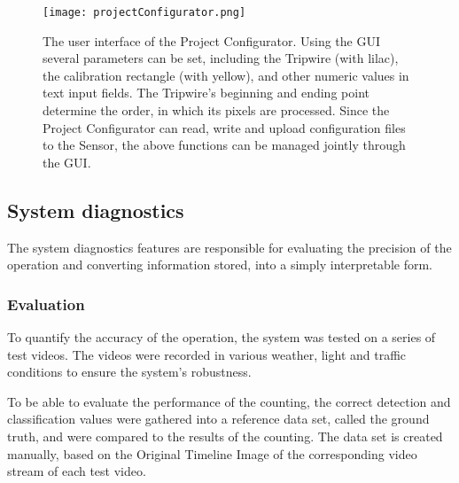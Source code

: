 \begin{figure}[!h]
	\centering
	\texttt{[image: projectConfigurator.png]}
	\caption{The user interface of the Project Configurator. Using the GUI several parameters can be set, including the Tripwire (with lilac), the calibration rectangle (with yellow), and other numeric values in text input fields. The Tripwire's beginning and ending point determine the order, in which its pixels are processed. Since the Project Configurator can read, write and upload configuration files to the Sensor, the above functions can be managed jointly through the GUI. \label{fig:project_configurator}}
\end{figure}
\subsection{System diagnostics}
The system diagnostics features are responsible for evaluating the precision of the operation and converting information stored, into a simply interpretable form.
\subsubsection{Evaluation}\label{chap:evaluation}
To quantify the accuracy of the operation, the system was tested on a series of test videos.
The videos were recorded in various weather, light and traffic conditions to ensure the system's robustness.

To be able to evaluate the performance of the counting, the correct detection and classification values were gathered into a reference data set, called the ground truth, and were compared to the results of the counting.
The data set is created manually, based on the Original Timeline Image of the corresponding video stream of each test video.

